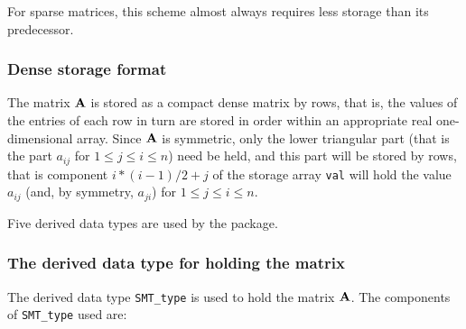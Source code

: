 \documentclass{galahad}
\begin{document}
For sparse matrices, this scheme almost always requires less storage than
its predecessor.

\subsubsection{Dense storage format}\label{dense}
The matrix ${\mathbf{A}}$ is stored as a compact
dense matrix by rows, that is, the values of the entries of each row in turn are
stored in order within an appropriate real one-dimensional array.
Since ${\mathbf{A}}$ is symmetric, only the lower triangular part (that is the part
$a_{ij}$ for $1 \leq j \leq i \leq n$) need be held, and this part will be
stored by rows, that is component
$i \ast (i-1)/2 + j$ of the storage array {\tt val}
will hold the value $a_{ij}$ (and, by symmetry, $a_{ji}$)
for $1 \leq j \leq i \leq n$.









\galtypes
Five derived data types are used by the package.


\subsubsection{The derived data type for holding the matrix}\label{typeprob}
The derived data type {\tt SMT\_type} is used to hold the matrix ${\mathbf{A}}$.
The components of {\tt SMT\_type} used are:
\end{document}
